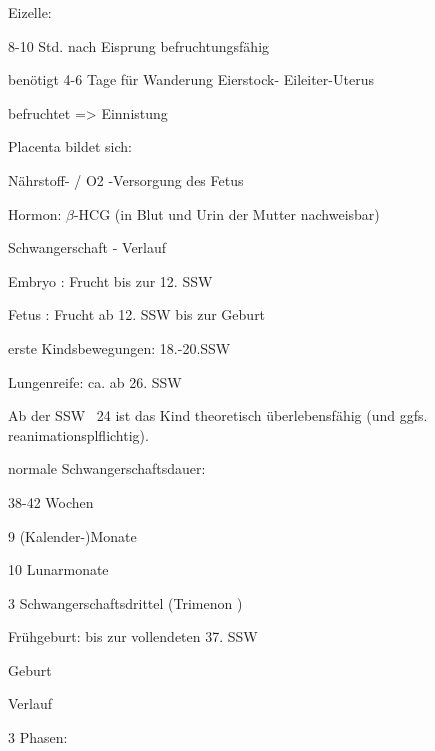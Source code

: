 \documentclass{article}
\begin{document}
Eizelle:

8-10 Std. nach Eisprung befruchtungsf\"ahig

ben\"otigt 4-6 Tage f\"ur Wanderung Eierstock- Eileiter-Uterus

befruchtet ={\textgreater} Einnistung

Placenta bildet sich: 

N\"ahrstoff- / O2 -Versorgung des Fetus

Hormon: ${\beta}$-HCG (in Blut und Urin der Mutter nachweisbar)

Schwangerschaft - Verlauf

Embryo : Frucht bis zur 12. SSW

Fetus : Frucht ab 12. SSW bis zur Geburt

erste Kindsbewegungen: 18.-20.SSW

Lungenreife: ca. ab 26. SSW 

Ab der SSW ~24 ist das Kind theoretisch \"uberlebensf\"ahig (und ggfs.
reanimationsplflichtig).

normale Schwangerschaftsdauer:

38-42 Wochen

9 (Kalender-)Monate

10 Lunarmonate

3 Schwangerschaftsdrittel (Trimenon )

Fr\"uhgeburt: bis zur vollendeten 37. SSW

Geburt 

Verlauf

3 Phasen:
\end{document}
